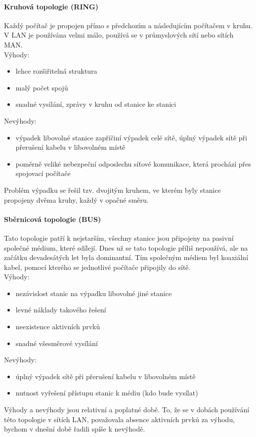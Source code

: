 \documentclass[10pt,a4paper]{article}
\begin{document}
\paragraph{Kruhová topologie (RING)}
Každý počítač je propojen přímo s předchozím a následujícím počítačem v kruhu. V LAN je používána velmi málo, používá se v průmyslových sítí nebo sítích MAN. \\ Výhody:
\begin{itemize}
	\item lehce rozšiřitelná struktura
	\item malý počet spojů
	\item snadné vysílání, zprávy v kruhu od stanice ke stanici
\end{itemize}
Nevýhody:
\begin{itemize}
	\item výpadek libovolné stanice zapříčiní výpadek celé sítě, úplný výpadek sítě při přerušení kabelu v  libovolném místě
	\item poměrně veliké nebezpeční odposlechu síťové komunikace, která prochází přes spojovací počítače
\end{itemize}
Problém výpadku se řešil tzv. dvojitým kruhem, ve kterém byly stanice propojeny dvěma kruhy, každý v opačné směru.
\paragraph{Sběrnicová topologie (BUS)}
Tato topologie patří k nejstarším, všechny stanice jsou připojeny na pasivní společné médium, které sdílejí. Dnes už se tato topologie příliš nepoužívá, ale na začátku devadesátých let byla dominantní. Tím společným médiem byl koaxiální kabel, pomocí kterého se jednotlivé počítače připojily do sítě. \\
Výhody:
\begin{itemize}
	\item nezávislost stanic na výpadku libovolné jiné stanice
	\item levné náklady takového řešení
	\item neexistence aktivních prvků
	\item snadné všesměrové vysílání
\end{itemize}
Nevýhody:
\begin{itemize}
	\item úplný výpadek sítě při přerušení kabelu v libovolném místě
	\item nutnost vyřešení přístupu stanic k médiu (kdo bude vysílat)
\end{itemize}
Výhody a nevýhody jsou relativní a poplatné době. To, že se v dobách používání této topologie v sítích LAN, považovala absence aktivních prvků za výhodu, bychom v dnešní době řadili spíše k nevýhodě.
\end{document}
